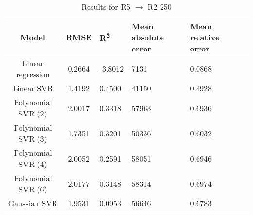 \begin{table}[H]
\centering
\begin{adjustbox}{center}
\begin{tabular}{c | c M{1.2cm} M{2.5cm} M{2.5cm} M{1.8cm}}
Model & RMSE & R\textsuperscript{2} & Mean absolute error & Mean relative error \tabularnewline
\hline
Linear regression & 0.2664 & -3.8012 &   7131 & 0.0868 \\
Linear SVR & 1.4192 & 0.4500 &  41150 & 0.4928 \\
Polynomial SVR (2) & 2.0017 & 0.3318 &  57963 & 0.6936 \\
Polynomial SVR (3) & 1.7351 & 0.3201 &  50336 & 0.6032 \\
Polynomial SVR (4) & 2.0052 & 0.2591 &  58051 & 0.6946 \\
Polynomial SVR (6) & 2.0177 & 0.3148 &  58314 & 0.6974 \\
Gaussian SVR & 1.9531 & 0.0953 &  56646 & 0.6783 \\
\end{tabular}
\end{adjustbox}
\\
\caption{Results for R5 $\rightarrow$ R2-250}
\label{tab:coreonly_linear_R5_R2_250}
\end{table}
